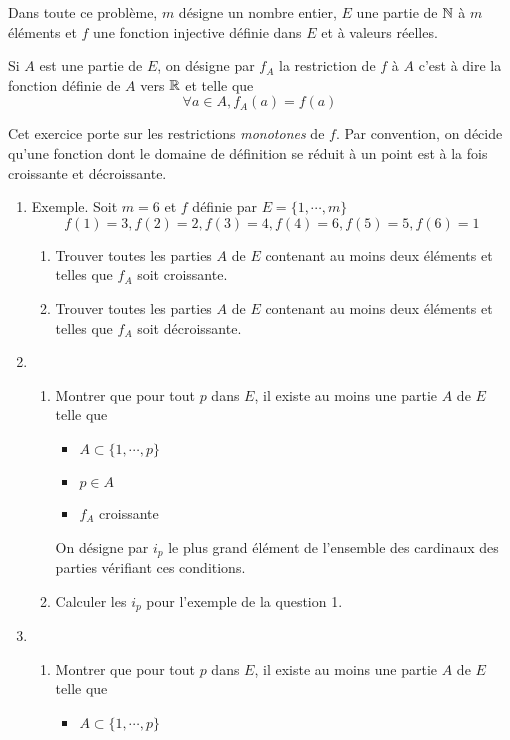 Dans toute ce problème, $m$ d{\'e}signe un nombre entier, $E$ une partie de $\mathbb{N}$ à $m$ éléments et $f$ une fonction injective d{\'e}finie dans $E$ et {\`a} valeurs r{\'e}elles.

Si $A$ est une partie de $E$, on d{\'e}signe par $f_A$ la restriction de $f$ {\`a} $A$ c'est {\`a} dire la fonction d{\'e}finie de $A$ vers $\mathbb{R}$ et telle que
\[\forall a\in A, f_A(a)=f(a)\]

Cet exercice porte sur les restrictions \emph{monotones} de $f$. Par convention, on d{\'e}cide qu'une fonction dont le domaine de d{\'e}finition se r{\'e}duit {\`a} un point est {\`a} la fois croissante et d{\'e}croissante.
\begin{enumerate}
\item Exemple. Soit $m=6$ et $f$ d{\'e}finie par  $E = \{1,\cdots,m\}$
\[f(1)=3,f(2)=2,f(3)=4,f(4)=6,f(5)=5,f(6)=1\]
    \begin{enumerate}
        \item Trouver toutes les parties $A$ de $E$ contenant au moins deux {\'e}l{\'e}ments et telles que $f_A$ soit croissante.
        \item  Trouver toutes les parties $A$ de $E$ contenant au moins  deux {\'e}l{\'e}ments et telles que $f_A$ soit d{\'e}croissante.
    \end{enumerate}
\item \begin{enumerate}
        \item Montrer que pour tout $p$ dans $E$, il existe au moins une partie $A$ de $E$ telle que
\begin{itemize}
  \item $A\subset\{1,\cdots,p\}$
  \item $p\in A$
  \item $f_A$ croissante
\end{itemize}
On d{\'e}signe par $i_p$ le plus grand {\'e}l{\'e}ment de l'ensemble des cardinaux des parties v{\'e}rifiant ces conditions.
        \item Calculer les $i_p$ pour l'exemple de la question 1.
      \end{enumerate}
\item \begin{enumerate}
        \item Montrer que pour tout $p$ dans $E$, il existe au
        moins une partie $A$ de $E$ telle que
\begin{itemize}
  \item $A\subset\{1,\cdots,p\}$

\end{itemize}
\end{enumerate}
\end{enumerate}
